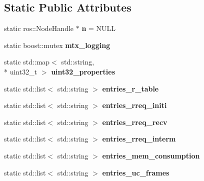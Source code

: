 \subsection*{Static Public Attributes}
\begin{DoxyCompactItemize}
\item 
\hypertarget{classLogging_a0bfdf0d48abb9389aa6eae29a83809a5}{static ros\-::\-Node\-Handle $\ast$ {\bfseries n} = N\-U\-L\-L}\label{classLogging_a0bfdf0d48abb9389aa6eae29a83809a5}

\item 
\hypertarget{classLogging_af3628482ac74ada97e157ce34fe2e75a}{static boost\-::mutex {\bfseries mtx\-\_\-logging}}\label{classLogging_af3628482ac74ada97e157ce34fe2e75a}

\item 
\hypertarget{classLogging_a14b5371406a5fbbfe9771b7055c1e38c}{static std\-::map$<$ std\-::string, \\*
uint32\-\_\-t $>$ {\bfseries uint32\-\_\-properties}}\label{classLogging_a14b5371406a5fbbfe9771b7055c1e38c}

\item 
\hypertarget{classLogging_a08c5e75e1e6d41fdaccb26d48b550d87}{static std\-::list$<$ std\-::string $>$ {\bfseries entries\-\_\-r\-\_\-table}}\label{classLogging_a08c5e75e1e6d41fdaccb26d48b550d87}

\item 
\hypertarget{classLogging_aa9bf2ef5f8c6a472a0f43bf7532ea51d}{static std\-::list$<$ std\-::string $>$ {\bfseries entries\-\_\-rreq\-\_\-initi}}\label{classLogging_aa9bf2ef5f8c6a472a0f43bf7532ea51d}

\item 
\hypertarget{classLogging_a97a2b46a48e9962da3da94f125eb3d31}{static std\-::list$<$ std\-::string $>$ {\bfseries entries\-\_\-rreq\-\_\-recv}}\label{classLogging_a97a2b46a48e9962da3da94f125eb3d31}

\item 
\hypertarget{classLogging_abb7414f8928b7e1986d52483c3f524e7}{static std\-::list$<$ std\-::string $>$ {\bfseries entries\-\_\-rreq\-\_\-interm}}\label{classLogging_abb7414f8928b7e1986d52483c3f524e7}

\item 
\hypertarget{classLogging_a3c1cc54cfe7e86ea55d2f037b7222ec7}{static std\-::list$<$ std\-::string $>$ {\bfseries entries\-\_\-mem\-\_\-consumption}}\label{classLogging_a3c1cc54cfe7e86ea55d2f037b7222ec7}

\item 
\hypertarget{classLogging_a6fc3cddf75a735143f8786137e3c1ec0}{static std\-::list$<$ std\-::string $>$ {\bfseries entries\-\_\-uc\-\_\-frames}}\label{classLogging_a6fc3cddf75a735143f8786137e3c1ec0}


\end{DoxyCompactItemize}

